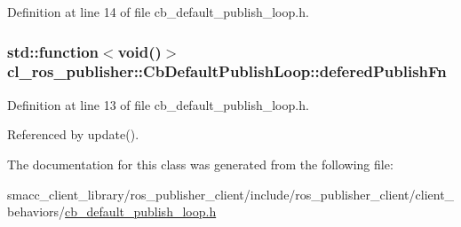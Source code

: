 Definition at line 14 of file cb\+\_\+default\+\_\+publish\+\_\+loop.\+h.

\subsubsection[{\texorpdfstring{defered\+Publish\+Fn}{deferedPublishFn}}]{\setlength{\rightskip}{0pt plus 5cm}std\+::function$<$void()$>$ cl\+\_\+ros\+\_\+publisher\+::\+Cb\+Default\+Publish\+Loop\+::defered\+Publish\+Fn\hspace{0.3cm}{\ttfamily [private]}}\hypertarget{classcl__ros__publisher_1_1CbDefaultPublishLoop_ac0044704637edbd8f79a69d5b06de9ba}{}\label{classcl__ros__publisher_1_1CbDefaultPublishLoop_ac0044704637edbd8f79a69d5b06de9ba}


Definition at line 13 of file cb\+\_\+default\+\_\+publish\+\_\+loop.\+h.



Referenced by update().



The documentation for this class was generated from the following file\+:\begin{DoxyCompactItemize}
\item 
smacc\+\_\+client\+\_\+library/ros\+\_\+publisher\+\_\+client/include/ros\+\_\+publisher\+\_\+client/client\+\_\+behaviors/\hyperlink{cb__default__publish__loop_8h}{cb\+\_\+default\+\_\+publish\+\_\+loop.\+h}\end{DoxyCompactItemize}
